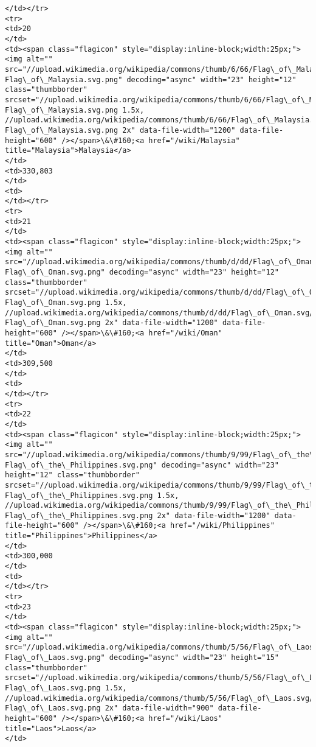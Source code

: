 \documentclass[11pt]{article}
\begin{document}
\begin{Verbatim}[commandchars=\\\{\}]
</td></tr>
<tr>
<td>20
</td>
<td><span class="flagicon" style="display:inline-block;width:25px;"><img alt="" src="//upload.wikimedia.org/wikipedia/commons/thumb/6/66/Flag\_of\_Malaysia.svg/23px-Flag\_of\_Malaysia.svg.png" decoding="async" width="23" height="12" class="thumbborder" srcset="//upload.wikimedia.org/wikipedia/commons/thumb/6/66/Flag\_of\_Malaysia.svg/35px-Flag\_of\_Malaysia.svg.png 1.5x, //upload.wikimedia.org/wikipedia/commons/thumb/6/66/Flag\_of\_Malaysia.svg/46px-Flag\_of\_Malaysia.svg.png 2x" data-file-width="1200" data-file-height="600" /></span>\&\#160;<a href="/wiki/Malaysia" title="Malaysia">Malaysia</a>
</td>
<td>330,803
</td>
<td>
</td></tr>
<tr>
<td>21
</td>
<td><span class="flagicon" style="display:inline-block;width:25px;"><img alt="" src="//upload.wikimedia.org/wikipedia/commons/thumb/d/dd/Flag\_of\_Oman.svg/23px-Flag\_of\_Oman.svg.png" decoding="async" width="23" height="12" class="thumbborder" srcset="//upload.wikimedia.org/wikipedia/commons/thumb/d/dd/Flag\_of\_Oman.svg/35px-Flag\_of\_Oman.svg.png 1.5x, //upload.wikimedia.org/wikipedia/commons/thumb/d/dd/Flag\_of\_Oman.svg/46px-Flag\_of\_Oman.svg.png 2x" data-file-width="1200" data-file-height="600" /></span>\&\#160;<a href="/wiki/Oman" title="Oman">Oman</a>
</td>
<td>309,500
</td>
<td>
</td></tr>
<tr>
<td>22
</td>
<td><span class="flagicon" style="display:inline-block;width:25px;"><img alt="" src="//upload.wikimedia.org/wikipedia/commons/thumb/9/99/Flag\_of\_the\_Philippines.svg/23px-Flag\_of\_the\_Philippines.svg.png" decoding="async" width="23" height="12" class="thumbborder" srcset="//upload.wikimedia.org/wikipedia/commons/thumb/9/99/Flag\_of\_the\_Philippines.svg/35px-Flag\_of\_the\_Philippines.svg.png 1.5x, //upload.wikimedia.org/wikipedia/commons/thumb/9/99/Flag\_of\_the\_Philippines.svg/46px-Flag\_of\_the\_Philippines.svg.png 2x" data-file-width="1200" data-file-height="600" /></span>\&\#160;<a href="/wiki/Philippines" title="Philippines">Philippines</a>
</td>
<td>300,000
</td>
<td>
</td></tr>
<tr>
<td>23
</td>
<td><span class="flagicon" style="display:inline-block;width:25px;"><img alt="" src="//upload.wikimedia.org/wikipedia/commons/thumb/5/56/Flag\_of\_Laos.svg/23px-Flag\_of\_Laos.svg.png" decoding="async" width="23" height="15" class="thumbborder" srcset="//upload.wikimedia.org/wikipedia/commons/thumb/5/56/Flag\_of\_Laos.svg/35px-Flag\_of\_Laos.svg.png 1.5x, //upload.wikimedia.org/wikipedia/commons/thumb/5/56/Flag\_of\_Laos.svg/45px-Flag\_of\_Laos.svg.png 2x" data-file-width="900" data-file-height="600" /></span>\&\#160;<a href="/wiki/Laos" title="Laos">Laos</a>
</td>

\end{Verbatim}
\end{document}
